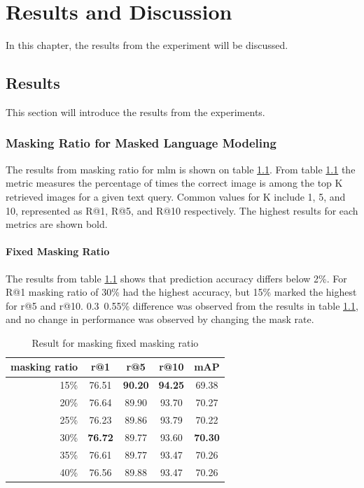 

\chapter{Results and Discussion}
In this chapter, the results from the experiment will be discussed.

\section{Results}
This section will introduce the results from the experiments.

\subsection{Masking Ratio for Masked Language Modeling}
The results from masking ratio for \acrshort{mlm} is shown on table \ref{tb:fixed_mlm}. From table \ref{tb:fixed_mlm} the metric measures the percentage of times the correct image is among the top K retrieved images for a given text query. Common values for K include 1, 5, and 10, represented as R@1, R@5, and R@10 respectively. The highest results for each metrics are shown bold.

\subsubsection{Fixed Masking Ratio}
The results from table \ref{tb:fixed_mlm} shows that prediction accuracy differs below 2\%. For R@1 masking ratio of 30\% had the highest accuracy, but 15\% marked the highest for r@5 and r@10. 0.3~0.55\% difference was observed from the results in table \ref{tb:fixed_mlm}, and no change in performance was observed by changing the mask rate.

\begin{table}[htbp]
    \centering
    \caption{Result for masking fixed masking ratio}
    \label{tb:fixed_mlm}
    
    \begin{tabular}{rcccc}
      masking ratio & r@1 & r@5 & r@10 & mAP\\ \hline
      15\% & 76.51 & \textbf{90.20} & \textbf{94.25} & 69.38 \\
      20\% & 76.64 & 89.90 & 93.70 & 70.27 \\
      25\% & 76.23 & 89.86 & 93.79 & 70.22 \\
      30\% & \textbf{76.72} & 89.77 & 93.60 & \textbf{70.30} \\
      35\% & 76.61 & 89.77 & 93.47 & 70.26 \\
      40\% & 76.56 & 89.88 & 93.47 & 70.26
    \end{tabular}
\end{table}


